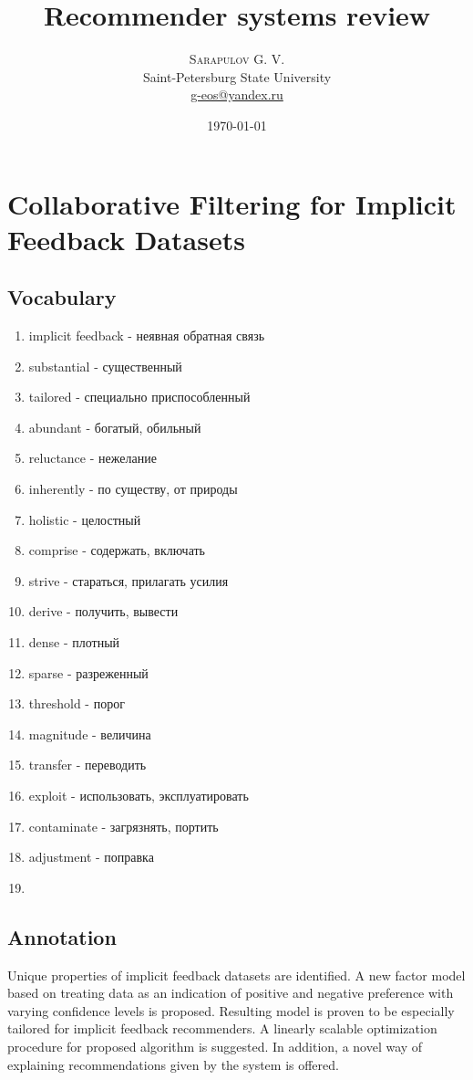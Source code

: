 \documentclass{article}
\title{Recommender systems review} %
\author{%
\textsc{Sarapulov G. V.} \\ %
\normalsize Saint-Petersburg State University \\ %
\normalsize \href{mailto:john@smith.com}{g-eos@yandex.ru} %
}
\date{\today} %
\begin{document}
\maketitle


\section{Collaborative Filtering for Implicit Feedback Datasets}
\subsection{Vocabulary}
\begin{enumerate}
\item implicit feedback - неявная обратная связь
\item substantial - существенный
\item tailored - специально приспособленный
\item abundant - богатый, обильный
\item reluctance - нежелание
\item inherently - по существу, от природы
\item holistic - целостный
\item comprise - содержать, включать
\item strive - стараться, прилагать усилия
\item derive - получить, вывести
\item dense - плотный
\item sparse - разреженный
\item threshold - порог
\item magnitude - величина
\item transfer - переводить
\item exploit - использовать, эксплуатировать
\item contaminate - загрязнять, портить
\item adjustment - поправка
\item 
\end{enumerate}

\subsection{Annotation}
Unique properties of implicit feedback datasets are identified. A new factor model based on treating data as an indication of positive and negative preference with varying confidence levels is proposed. Resulting model is proven to be especially tailored for implicit feedback recommenders. A linearly scalable optimization procedure for proposed algorithm is suggested. In addition, a novel way of explaining recommendations given by the system is offered.
\end{document}
